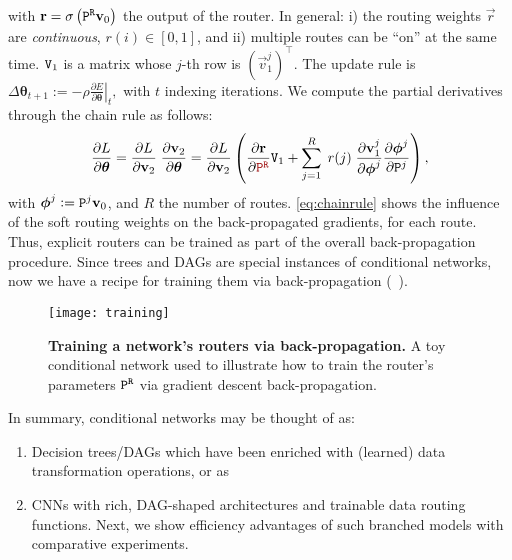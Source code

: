 \documentclass[thesis]{subfiles}
\begin{document}
	with $\vec r= \sigma \left( \mat P^{\tt R} \vec v_0 \right)$ the output of the router.
	In general: 
	i) the routing weights $\vec r$ are {\em continuous}, $r(i)\in[0,1]$, and
	ii) multiple routes can be ``on'' at the same time.
	$\mat V_1$ is a matrix whose $j$-th row is $(\vec v_1^j) ^\top$.
	The update rule is
	$
	\Delta \boldsymbol\theta_{t+1}  := -\rho \left. \frac{\partial E}{\partial \boldsymbol\theta} \right|_t,
	$ with $t$ indexing iterations. We compute the partial derivatives through the chain rule as follows:
	\begin{equation}
	\frac{\partial L}{\partial \boldsymbol\theta} = 
	\frac{\partial L}{\partial \vec v_2} \; 
	\frac{\partial \vec v_2}{\partial \boldsymbol\theta} = 
	\frac{\partial L}{\partial \vec v_2} \left( 
	\frac{\partial \vec r}{\partial \textcolor{myred}{\mat P^{\tt R}}} \mat V_1 +  
	\sum_{j=1}^{R} \;r(j)\; 
	\frac{\partial \vec v_1^j}{\partial \boldsymbol\phi^j} 
	\frac{\partial \boldsymbol\phi^j}{\partial \mat P^j}\right)
	\label{eq:chainrule},
	\end{equation}
	with $\boldsymbol{\phi}^j := \mat P^j \vec v_0$, and $R$ the number of routes. 
	\cref{eq:chainrule} shows the influence of the soft routing weights on the 
	back-propagated gradients, for each route.
	Thus, explicit routers can be trained as part of the overall back-propagation procedure. 
	Since trees and DAGs are special instances of conditional networks, 
	now we have a recipe for training them via back-propagation (\cf~\cite{Kontschieder2015,Schulter2013Alternating,Suarez1999GlobalTree}).
	
	
	\begin{figure}[tbp]
	\centerline{
	\texttt{[image: training]}
	}
	   \caption{{\bf Training a network's routers via back-propagation.} 
	   A toy conditional network used to illustrate how to train the router's parameters $\mat P^{\tt R}$ via gradient descent back-propagation.}
	\label{fig:training}
	\end{figure}
	
	In summary, conditional networks may be thought of as:
	\begin{enumerate}
	\item Decision trees/DAGs which have been enriched with (learned) data transformation operations, or as
	\item CNNs with rich, DAG-shaped architectures and trainable data routing functions. 
	Next, we show efficiency advantages of such branched models with comparative experiments.
	\end{enumerate}
	
\end{document}
